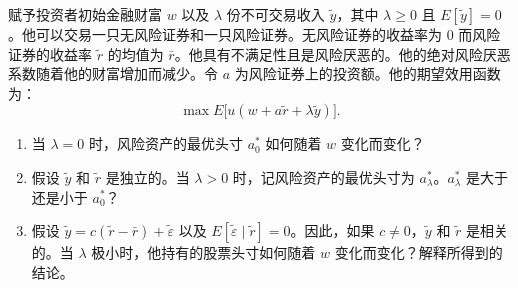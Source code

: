 \begin{problem}
 赋予投资者初始金融财富 $w$ 以及 $\lambda$ 份不可交易收入 $\tilde{y}$，其中 $\lambda\ge 0$ 且 $E[\tilde{y}]=0$。他可以交易一只无风险证券和一只风险证券。无风险证券的收益率为 0 而风险证券的收益率 $\tilde{r}$ 的均值为 $\bar{r}$。他具有不满足性且是风险厌恶的。他的绝对风险厌恶系数随着他的财富增加而减少。令 $a$ 为风险证券上的投资额。他的期望效用函数为：
\[
    \max E\bigl[u(w+a\tilde{r}+\lambda\tilde{y})\bigr].
\]
\begin{enumerate}[label=(\alph*)]
    \item 当 $\lambda=0$ 时，风险资产的最优头寸 $a_{0}^{*}$ 如何随着 $w$ 变化而变化？
    \item 假设 $\tilde{y}$ 和 $\tilde{r}$ 是独立的。当 $\lambda>0$ 时，记风险资产的最优头寸为 $a_{\lambda}^{*}$。$a_{\lambda}^{*}$ 是大于还是小于 $a_{0}^{*}$？
    \item 假设 $\tilde{y}=c(\tilde{r}-\bar{r})+\tilde{\varepsilon}$ 以及 $E[\tilde{\varepsilon}\mid\tilde{r}]=0$。因此，如果 $c\neq 0$，$\tilde{y}$ 和 $\tilde{r}$ 是相关的。当 $\lambda$ 极小时，他持有的股票头寸如何随着 $w$ 变化而变化？解释所得到的结论。
\end{enumerate}
\end{problem}
